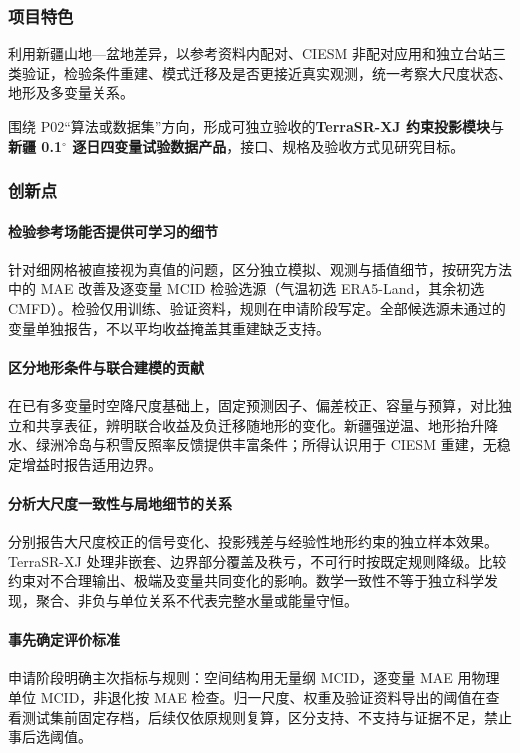 \subsubsection{项目特色}

利用新疆山地—盆地差异，以参考资料内配对、CIESM 非配对应用和独立台站三类验证，检验条件重建、模式迁移及是否更接近真实观测，统一考察大尺度状态、地形及多变量关系。

围绕 P02“算法或数据集”方向，形成可独立验收的\textbf{TerraSR-XJ 约束投影模块}与\textbf{新疆 0.1$^{\circ}$ 逐日四变量试验数据产品}，接口、规格及验收方式见研究目标。

\subsubsection{创新点}

\paragraph{检验参考场能否提供可学习的细节}
针对细网格被直接视为真值的问题，区分独立模拟、观测与插值细节，按研究方法中的 MAE 改善及逐变量 MCID 检验选源（气温初选 ERA5-Land，其余初选 CMFD）。检验仅用训练、验证资料，规则在申请阶段写定。全部候选源未通过的变量单独报告，不以平均收益掩盖其重建缺乏支持。

\paragraph{区分地形条件与联合建模的贡献}
在已有多变量时空降尺度基础上，固定预测因子、偏差校正、容量与预算，对比独立和共享表征，辨明联合收益及负迁移随地形的变化。新疆强逆温、地形抬升降水、绿洲冷岛与积雪反照率反馈提供丰富条件；所得认识用于 CIESM 重建，无稳定增益时报告适用边界。

\paragraph{分析大尺度一致性与局地细节的关系}
分别报告大尺度校正的信号变化、投影残差与经验性地形约束的独立样本效果。TerraSR-XJ 处理非嵌套、边界部分覆盖及秩亏，不可行时按既定规则降级。比较约束对不合理输出、极端及变量共同变化的影响。数学一致性不等于独立科学发现，聚合、非负与单位关系不代表完整水量或能量守恒。

\paragraph{事先确定评价标准}
申请阶段明确主次指标与规则：空间结构用无量纲 MCID，逐变量 MAE 用物理单位 MCID，非退化按 MAE 检查。归一尺度、权重及验证资料导出的阈值在查看测试集前固定存档，后续仅依原规则复算，区分支持、不支持与证据不足，禁止事后选阈值。
